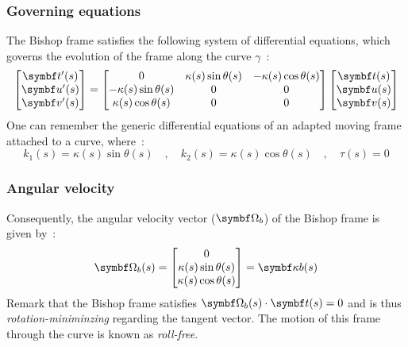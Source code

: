 \subsubsection{Governing equations}
The Bishop frame satisfies the following system of differential equations, which governs the evolution of the frame along the curve $\gamma$~:
\begin{equation}
	\begin{bmatrix}
		\vect{t}'(s) \\
		\vect{u}'(s) \\
		\vect{v}'(s)
	\end{bmatrix}
	=
	\begin{bmatrix}
		0 & \kappa(s) \sin \theta(s) & -\kappa(s) \cos \theta(s) \\
		-\kappa(s) \sin \theta(s) & 0 & 0 \\
		\kappa(s) \cos \theta(s) & 0 & 0
	\end{bmatrix}
	\begin{bmatrix}
		\vect{t}(s) \\
		\vect{u}(s) \\
		\vect{v}(s)
	\end{bmatrix}
\label{eq:3_12}
\end{equation}
One can remember the generic differential equations of an adapted moving frame attached to a curve, where~:
\begin{equation}
k_{1}(s) = \kappa(s) \sin \theta(s)
\quad,\quad
k_{2}(s) = \kappa(s) \cos \theta(s)
\quad,\quad
\tau(s) = 0
\end{equation}

\subsubsection{Angular velocity}\label{sec=bishopvelocity}
Consequently, the angular velocity vector ($\vect{\Omega_{b}}$) of the Bishop frame is given by~:
\begin{equation}
	\vect{\Omega_b}(s) 
	=
	\begin{bmatrix}
		0\\
		\kappa(s) \sin \theta(s)\\
		\kappa(s) \cos \theta(s)
	\end{bmatrix}
	= \vect{\kappa b}(s) 
\end{equation}
Remark that the Bishop frame satisfies $\vect{\Omega_b}(s) \cdot \vect{t}(s) = 0$ and is thus \emph{rotation-miniminzing} regarding the tangent vector. The motion of this frame through the curve is known as \emph{roll-free}.

